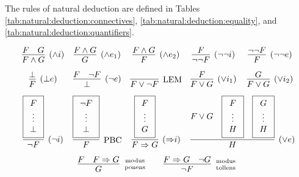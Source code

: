 
\begin{definition}\label{def:natural:deduction}
	The rules of {\myem natural deduction} are defined in Tables 
	\ref{tab:natural:deduction:connectives}, \ref{tab:natural:deduction:equality}, 
	and \ref{tab:natural:deduction:quantifiers}.

\begin{table}[hbt]
\begin{gather*}
\begin{array}{ccccc}
\infer[(\land i)]{F\land G}{F & G} 
&
\infer[(\land e_1)]{G}{F \land G} 
&
\infer[(\land e_2)]{F}{F \land G}
&
\infer[(\lnot\lnot i)]{\lnot\lnot F}{F} 
&
\infer[(\lnot\lnot e)]{F}{\lnot\lnot F}
\\[0.7em]
\infer[(\bot e)]{F}{\bot}
&
\infer[(\lnot e)]{\bot}{F & \lnot F}
&
\infer[\text{LEM}]{F\lor\lnot F}{}
&
\infer[(\lor i_1)]{F\lor G}{F}
&
\infer[(\lor i_2)]{F\lor G}{G}
\\[0.7em]
\infer[(\lnot i)]{\lnot F}{
	\boxed{\begin{array}{c}F\\\vdots\\\bot\end{array}}}
&
\infer[\text{PBC}]{F}{
	\boxed{\begin{array}{c}\lnot F\\\vdots\\\bot\end{array}}}
&
\infer[({\limp} i)]{F\limp G}{
	\boxed{\begin{array}{c}F\\\vdots\\G\end{array}
}}
&
\multicolumn{2}{l}{
	\infer[(\lor e)]{H}{
		F\lor G &
		\boxed{\begin{array}{c}F\\\vdots\\H\end{array}} &
		\boxed{\begin{array}{c}G\\\vdots\\H\end{array}}
	}	
}
\\[0.7em]
&
\multicolumn{3}{r}{
\infer[\text{modus}\atop\text{ponens}]{G}{F & F\limp G}
\qquad
\infer[\text{modus}\atop\text{tollens}]{\lnot F}{F\limp G & \lnot G}
}
&
\end{array}
\end{gather*}

\end{table}
\end{definition}
